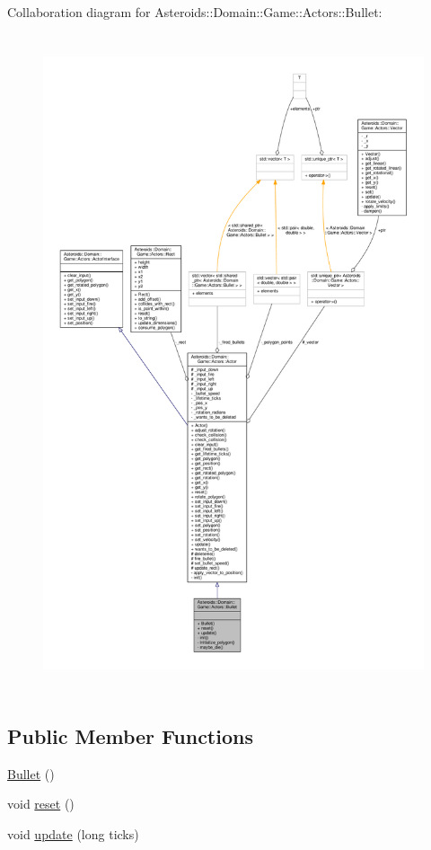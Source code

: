 Collaboration diagram for Asteroids\+:\+:Domain\+:\+:Game\+:\+:Actors\+:\+:Bullet\+:\nopagebreak
\begin{figure}[H]
\begin{center}
\leavevmode
\includegraphics[height=550pt]{classAsteroids_1_1Domain_1_1Game_1_1Actors_1_1Bullet__coll__graph}
\end{center}
\end{figure}
\subsection*{Public Member Functions}
\begin{DoxyCompactItemize}
\item 
\hyperlink{classAsteroids_1_1Domain_1_1Game_1_1Actors_1_1Bullet_a48557011de2d1939a8b5f7fe7e9fccda}{Bullet} ()
\item 
void \hyperlink{classAsteroids_1_1Domain_1_1Game_1_1Actors_1_1Bullet_ae3837ed471d290688f684e8187e6865e}{reset} ()
\item 
void \hyperlink{classAsteroids_1_1Domain_1_1Game_1_1Actors_1_1Bullet_a06eb5b7aa30c8547159696c82fd2f642}{update} (long ticks)
\end{DoxyCompactItemize}
